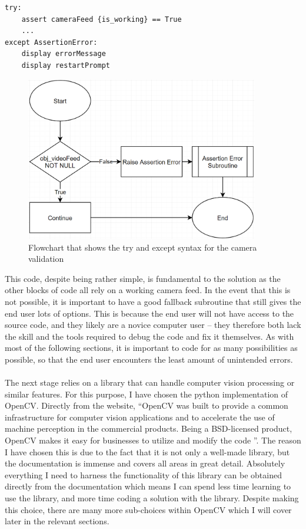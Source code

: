 \documentclass[9pt]{article}
\begin{document}
\begin{lstlisting}
try:
	assert cameraFeed {is_working} == True
	...
except AssertionError:
	display errorMessage
	display restartPrompt
\end{lstlisting}
\begin{figure}[H]
	\centering
	\includegraphics[width=4in]{flowCameraworking.png}
	\caption{Flowchart that shows the try and except syntax for the camera validation}\label{fig_cameraWorking}
\end{figure}
This code, despite being rather simple, is fundamental to the solution as the other blocks of code all rely on a working camera feed. In the event that this is not possible, it is important to have a good fallback subroutine that still gives the end user lots of options. This is because the end user will not have access to the source code, and they likely are a novice computer user – they therefore both lack the skill and the tools required to debug the code and fix it themselves. As with most of the following sections, it is important to code for as many possibilities as possible, so that the end user encounters the least amount of unintended errors.\\\\
The next stage relies on a library that can handle computer vision processing or similar features. For this purpose, I have chosen the python implementation of OpenCV. 
Directly from the website, ``OpenCV was built to provide a common infrastructure for computer vision applications and to accelerate the use of machine perception in the commercial products. Being a BSD-licensed product, OpenCV makes it easy for businesses to utilize and modify the code \cite{openCvAbout}”. The reason I have chosen this is due to the fact that it is not only a well-made library, but the documentation is immense and covers all areas in great detail. Absolutely everything I need to harness the functionality of this library can be obtained directly from the documentation which means I can spend less time learning to use the library, and more time coding a solution with the library. Despite making this choice, there are many more sub-choices within OpenCV which I will cover later in the relevant sections.
\end{document}
